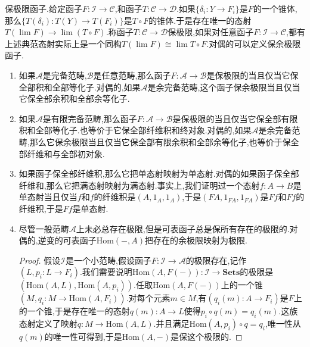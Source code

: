 保极限函子.给定函子$F:\mathscr{I}\to\mathscr{C}$,和函子$T:\mathscr{C}\to\mathscr{D}$.如果$\{\delta_i:Y\to F_i\}$是$F$的一个锥体,那么$\{T(\delta_i):T(Y)\to T(F_i)\}$是$T\circ F$的锥体.于是存在唯一的态射$T(\lim F)\to\lim(T\circ F)$.称函子$T:\mathscr{C}\to\mathscr{D}$保极限,如果对任意函子$F:\mathscr{I}\to\mathscr{C}$,都有上述典范态射实际上是一个同构$T(\lim F)\cong\lim T\circ F$.对偶的可以定义保余极限函子.
\begin{enumerate}
	\item 如果$\mathscr{A}$是完备范畴,$\mathscr{B}$是任意范畴,那么函子$F:\mathscr{A}\to\mathscr{B}$是保极限的当且仅当它保全部积和全部等化子.对偶的,如果$\mathscr{A}$是余完备范畴,这个函子保余极限当且仅当它保全部余积和全部余等化子.
	\item 如果$\mathscr{A}$是有限完备范畴,那么函子$F:\mathscr{A}\to\mathscr{B}$是保极限的当且仅当它保全部有限积和全部等化子.也等价于它保全部纤维积和终对象.对偶的,如果$\mathscr{A}$是余完备范畴,那么它保余极限当且仅当它保全部有限余积和全部余等化子,也等价于保全部纤维和与全部初对象.
	\item 如果函子保全部纤维积,那么它把单态射映射为单态射.对偶的如果函子保全部纤维和,那么它把满态射映射为满态射.事实上,我们证明过一个态射$f:A\to B$是单态射当且仅当$f$和$f$的纤维积是$(A,1_A,1_A)$,于是$(FA,1_{FA},1_{FA})$是$Ff$和$Ff$的纤维积,于是$Ff$是单态射.
	\item 尽管一般范畴$\mathscr{A}$上未必总存在极限,但是可表函子总是保所有存在的极限的.对偶的,逆变的可表函子$\mathrm{Hom}(-,A)$把存在的余极限映射为极限.
	\begin{proof}
		
		假设$\mathscr{I}$是一个小范畴,假设函子$F:\mathscr{I}\to\mathscr{A}$的极限存在,记作$(L,p_i:L\to F_i)$.我们需要说明$\mathrm{Hom}(A,F(-)):\mathscr{I}\to\textbf{Sets}$的极限是$\left(\mathrm{Hom}(A,L),\mathrm{Hom}(A,p_i)\right)$.任取$\mathrm{Hom}(A,F(-))$上的一个锥$(M,q_i:M\to\mathrm{Hom}(A,F_i))$.对每个元素$m\in M$,有$(q_i(m):A\to F_i)$是$F$上的一个锥,于是存在唯一的态射$q(m):A\to L$使得$p_i\circ q(m)=q_i(m)$.这族态射定义了映射$q:M\to\mathrm{Hom}(A,L)$.并且满足$\mathrm{Hom}(A,p_i)\circ q=q_i$,唯一性从$q(m)$的唯一性可得到,于是$\mathrm{Hom}(A,-)$是保这个极限的.
	\end{proof}
\end{enumerate}

